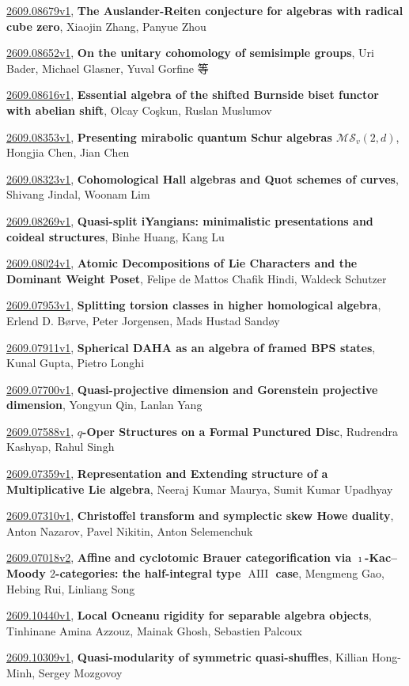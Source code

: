 \documentclass[9pt, a4paper]{article}
\theoremstyle{plain}
\theoremstyle{definition}
\theoremstyle{remark}
\newcommand{\arxiv}[3]{\href{https://arxiv.org/abs/#1}{#1}, \textbf{\textcolor{arxivblue}{#2}}, #3}
\begin{document}
\arxiv{2609.08679v1}{The Auslander-Reiten conjecture for algebras with radical cube zero}{Xiaojin Zhang, Panyue Zhou}

\arxiv{2609.08652v1}{On the unitary cohomology of semisimple groups}{Uri Bader, Michael Glasner, Yuval Gorfine 等}

\arxiv{2609.08616v1}{Essential algebra of the shifted Burnside biset functor with abelian shift}{Olcay Coşkun, Ruslan Muslumov}

\arxiv{2609.08353v1}{Presenting mirabolic quantum Schur algebras $\mathcal{MS}_v(2,d)$}{Hongjia Chen, Jian Chen}

\arxiv{2609.08323v1}{Cohomological Hall algebras and Quot schemes of curves}{Shivang Jindal, Woonam Lim}

\arxiv{2609.08269v1}{Quasi-split iYangians: minimalistic presentations and coideal structures}{Binhe Huang, Kang Lu}

\arxiv{2609.08024v1}{Atomic Decompositions of Lie Characters and the Dominant Weight Poset}{Felipe de Mattos Chafik Hindi, Waldeck Schutzer}

\arxiv{2609.07953v1}{Splitting torsion classes in higher homological algebra}{Erlend D. Børve, Peter Jorgensen, Mads Hustad Sandøy}

\arxiv{2609.07911v1}{Spherical DAHA as an algebra of framed BPS states}{Kunal Gupta, Pietro Longhi}

\arxiv{2609.07700v1}{Quasi-projective dimension and Gorenstein projective dimension}{Yongyun Qin, Lanlan Yang}

\arxiv{2609.07588v1}{$q$-Oper Structures on a Formal Punctured Disc}{Rudrendra Kashyap, Rahul Singh}

\arxiv{2609.07359v1}{Representation and Extending structure of a Multiplicative Lie algebra}{Neeraj Kumar Maurya, Sumit Kumar Upadhyay}

\arxiv{2609.07310v1}{Christoffel transform and symplectic skew Howe duality}{Anton Nazarov, Pavel Nikitin, Anton Selemenchuk}

\arxiv{2609.07018v2}{Affine and cyclotomic Brauer categorification via $\imath$-Kac--Moody $2$-categories: the half-integral type $\operatorname{AIII}$ case}{Mengmeng Gao, Hebing Rui, Linliang Song}

\arxiv{2609.10440v1}{Local Ocneanu rigidity for separable algebra objects}{Tinhinane Amina Azzouz, Mainak Ghosh, Sebastien Palcoux}

\arxiv{2609.10309v1}{Quasi-modularity of symmetric quasi-shuffles}{Killian Hong-Minh, Sergey Mozgovoy}
\end{document}

